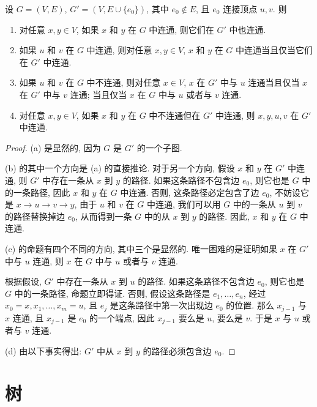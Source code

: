 \begin{theorem}
    设 $G=(V,E)$, $G'=(V,E\cup\{e_0\})$, 其中 $e_0\not\in E$, 且 $e_0$ 连接顶点 $u,v$. 则
    \begin{enumerate}[itemindent=0ex, itemsep=0pt, label=\upshape{(\alph*)}]
        \item 对任意 $x,y\in V$, 如果 $x$ 和 $y$ 在 $G$ 中连通, 则它们在 $G'$ 中也连通.
        \item 如果 $u$ 和 $v$ 在 $G$ 中连通, 则对任意 $x,y\in V$, $x$ 和 $y$ 在 $G$ 中连通当且仅当它们在 $G'$ 中连通.
        \item 如果 $u$ 和 $v$ 在 $G$ 中不连通, 则对任意 $x\in V$, $x$ 在 $G'$ 中与 $u$ 连通当且仅当 $x$ 在 $G'$ 中与 $v$ 连通; 当且仅当 $x$ 在 $G$ 中与 $u$ 或者与 $v$ 连通.
        \item 对任意 $x,y\in V$, 如果 $x$ 和 $y$ 在 $G$ 中不连通但在 $G'$ 中连通, 则 $x,y,u,v$ 在 $G'$ 中连通.
    \end{enumerate}
\end{theorem}

\begin{proof}
    (a) 是显然的, 因为 $G$ 是 $G'$ 的一个子图.

    (b) 的其中一个方向是 (a) 的直接推论. 对于另一个方向, 假设 $x$ 和 $y$ 在 $G'$ 中连通, 则 $G'$ 中存在一条从 $x$ 到 $y$ 的路径. 如果这条路径不包含边 $e_0$, 则它也是 $G$ 中的一条路径, 因此 $x$ 和 $y$ 在 $G$ 中连通. 否则, 这条路径必定包含了边 $e_0$, 不妨设它是 $x\to u\to v\to y$, 由于 $u$ 和 $v$ 在 $G$ 中连通, 我们可以用 $G$ 中的一条从 $u$ 到 $v$ 的路径替换掉边 $e_0$, 从而得到一条 $G$ 中的从 $x$ 到 $y$ 的路径. 因此, $x$ 和 $y$ 在 $G$ 中连通.

    (c) 的命题有四个不同的方向, 其中三个是显然的. 唯一困难的是证明如果 $x$ 在 $G'$ 中与 $u$ 连通, 则 $x$ 在 $G$ 中与 $u$ 或者与 $v$ 连通.

    根据假设, $G'$ 中存在一条从 $x$ 到 $u$ 的路径. 如果这条路径不包含边 $e_0$, 则它也是 $G$ 中的一条路径, 命题立即得证. 否则, 假设这条路径是 $e_1,\dots,e_n$, 经过 $x_0=x, x_1, \dots, x_m=u$, 且 $e_j$ 是这条路径中第一次出现边 $e_0$ 的位置. 那么 $x_{j-1}$ 与 $x$ 连通, 且 $x_{j-1}$ 是 $e_0$ 的一个端点, 因此 $x_{j-1}$ 要么是 $u$, 要么是 $v$. 于是 $x$ 与 $u$ 或者与 $v$ 连通.

    (d) 由以下事实得出: $G'$ 中从 $x$ 到 $y$ 的路径必须包含边 $e_0$.
\end{proof}

\section{树}

